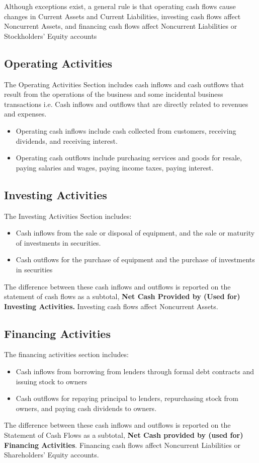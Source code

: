 \documentclass[../main.tex]{subfiles}
\begin{document}
	Although exceptions exist, a general rule is that operating cash flows 
	cause changes in Current Assets and Current Liabilities, investing cash 
	flows affect Noncurrent Assets, and financing cash flows affect Noncurrent 
	Liabilities or Stockholders’ Equity accounts
	
	\subsection{Operating Activities}
	
	The Operating Activities Section includes cash inflows and cash outflows 
	that result from the operations of the business and some incidental 
	business transactions i.e. Cash inflows and outflows that are directly 
	related to revenues and expenses.
	\begin{itemize}[noitemsep]
		\item Operating cash inflows include cash collected from customers,  
		receiving dividends, and receiving interest.
		\item Operating cash outflows include purchasing services and goods for 
		resale, paying salaries and wages, paying income taxes, paying interest.
	\end{itemize}

	\subsection{Investing Activities}
	
	The Investing Activities Section includes:
	\begin{itemize}[noitemsep]
		\item Cash inflows from the sale or disposal of equipment, and the sale 
		or maturity of investments in securities.
		\item Cash outflows for the purchase of equipment and the purchase of 
		investments in securities
	\end{itemize}
	The difference between these cash inflows and outflows is reported on the 
	statement of cash flows as a subtotal, \textbf{Net Cash Provided by (Used 
	for) Investing Activities.} Investing cash flows affect Noncurrent Assets.

	\subsection{Financing Activities}
	
	The financing activities section includes:
	\begin{itemize}[noitemsep]
		\item Cash inflows from borrowing from lenders through formal debt 
		contracts and issuing stock to owners
		\item Cash outflows for repaying principal to lenders, repurchasing 
		stock from owners, and paying cash dividends to owners.
	\end{itemize}
	The difference between these cash inflows and outflows is reported on the 
	Statement of Cash Flows as a subtotal, \textbf{Net Cash provided by (used 
	for) Financing Activities}. Financing cash flows affect Noncurrent 
	Liabilities or Shareholders’ Equity accounts.
	
\end{document}
